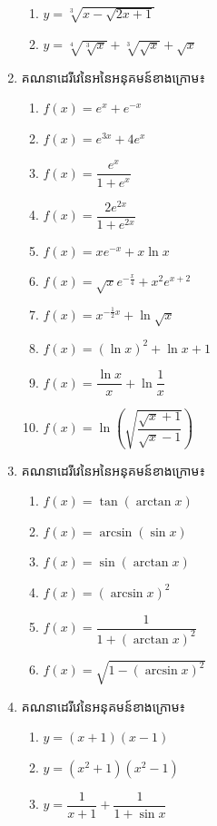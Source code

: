 \documentclass[12pt,fleqn]{book} %
\begin{document}
\begin{enumerate}
\begin{multicols}{2}
\begin{enumerate}
\item $y=\sqrt[3]{ x- \sqrt{2x+1}}$
\item $y= \sqrt[4]{\sqrt[3]{x}}+\sqrt[3]{\sqrt{x}}+\sqrt{x}$
\end{enumerate}
\end{multicols}
\item គណនាដេរីវេនៃអនៃអនុគមន៍ខាងក្រោម៖
\begin{multicols}{2}
\begin{enumerate}
\item $f(x)=e^x+e^{-x}$
\item $f(x)=e^{3x} +4e^x$
\item $f(x)=\dfrac{e^x}{1+e^x}$
\item $f(x)=\dfrac{2e^{2x}}{1+e^{2x}}$
\item $f(x)=xe^{-x}+x\ln x$
\item $f(x)=\sqrt{x}e^{-\frac{x}{4}}+x^2e^{x+2}$
\item $f(x)=x^{-\frac{1}{2}x}+\ln \sqrt{x}$
\item $f(x)=(\ln x)^2+\ln x+1$
\item $f(x)=\dfrac{\ln x}{x}+\ln \dfrac{1}{x}$
\item $f(x)=\ln \left( \sqrt{\dfrac{\sqrt{x}+1}{\sqrt{x}-1}}\right)$
\end{enumerate}
\end{multicols}
\item គណនាដេរីវេនៃអនៃអនុគមន៍ខាងក្រោម៖
\begin{multicols}{2}
\begin{enumerate}
\item $f(x)=\tan (\arctan x)$
\item $f(x)=\arcsin (\sin x)$
\item $f(x)=\sin (\arctan x)$
\item $f(x)=(\arcsin x)^2$
\item $f(x)=\dfrac{1}{1+(\arctan x)^2}$
\item $f(x)= \sqrt{1-(\arcsin x)^2}$
\end{enumerate}
\end{multicols}
\item គណនាដេរីវេនៃអនុគមន៍ខាងក្រោម៖
\begin{multicols}{2}
\begin{enumerate}
\item $y=(x+1)(x-1)$
\item $y=(x^2+1)(x^2-1)$
\item $y=\dfrac{1}{x+1}+\dfrac{1}{1+\sin x}$

\end{enumerate}
\end{multicols}
\end{enumerate}
\end{document}
